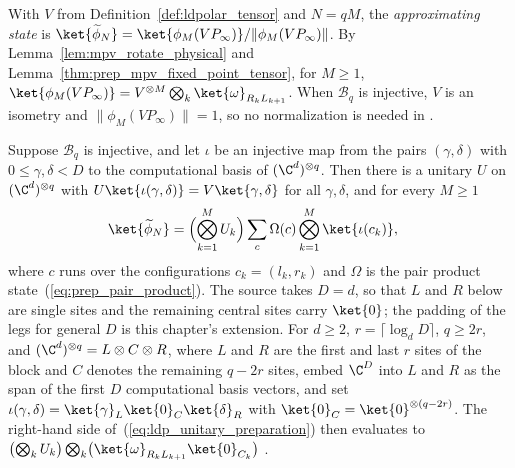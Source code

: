 \begin{definition}
    \label{def:ldp_approximating_state}
    \leanok
    With $V$ from Definition~\ref{def:ldpolar_tensor} and $N=qM$, the
    \emph{approximating state} is
    $\ket{\widetilde\phi_N}=\ket{\phi_M(VP_\infty)}/\lVert\phi_M(VP_\infty)\rVert$.
    By Lemma~\ref{lem:mpv_rotate_physical} and
    Lemma~\ref{thm:prep_mpv_fixed_point_tensor}, for $M\ge1$,
    $\ket{\phi_M(VP_\infty)}=V^{\otimes M}\bigotimes_k\ket{\omega}_{R_kL_{k+1}}$.
    When $\mathcal B_q$ is injective, $V$ is an isometry and
    $\lVert\phi_M(VP_\infty)\rVert=1$, so no normalization is needed in
    \cite[eqs.~(9) and~(10)]{Malz2024Preparation}.
\end{definition}

\begin{lemma}
    \label{thm:ldp_unitary_implementing_isometry}
    \leanok
    Suppose $\mathcal B_q$ is injective, and let $\iota$ be an injective map
    from the pairs $(\gamma,\delta)$ with $0\le\gamma,\delta<D$ to the
    computational basis of $(\C^d)^{\otimes q}$. Then there is a unitary $U$
    on $(\C^d)^{\otimes q}$ with $U\ket{\iota(\gamma,\delta)}=V\ket{\gamma,\delta}$
    for all $\gamma,\delta$, and for every $M\ge1$
    \begin{align}
        \ket{\widetilde\phi_N}
         & =\Bigl(\bigotimes_{k=1}^M U_k\Bigr)
        \sum_{c}\Omega(c)\bigotimes_{k=1}^M\ket{\iota(c_k)},
        \label{eq:ldp_unitary_preparation}
    \end{align}
    where $c$ runs over the configurations $c_k=(l_k,r_k)$ and $\Omega$ is the
    pair product state~(\ref{eq:prep_pair_product}). The source takes $D=d$,
    so that $L$ and $R$ below are single sites and the remaining central sites
    carry $\ket{0}$; the padding of the legs for general $D$ is this chapter's
    extension. For $d\ge2$,
    $r=\lceil\log_dD\rceil$, $q\ge2r$, and $(\C^d)^{\otimes q}=L\otimes C\otimes R$,
    where $L$ and $R$ are the first and last $r$ sites of the block and
    $C$ denotes the remaining $q-2r$ sites, embed $\C^D$ into $L$ and $R$
    as the span of the first $D$ computational basis vectors, and set
    $\iota(\gamma,\delta)=\ket{\gamma}_L\ket{0}_C\ket{\delta}_R$ with
    $\ket{0}_C=\ket{0}^{\otimes(q-2r)}$. The right-hand side
    of~(\ref{eq:ldp_unitary_preparation}) then evaluates to
    $\bigl(\bigotimes_kU_k\bigr)\bigotimes_k\bigl(\ket{\omega}_{R_kL_{k+1}}\ket{0}_{C_k}\bigr)$
    \cite[eqs.~(10) and~(11)]{Malz2024Preparation}.
\end{lemma}

